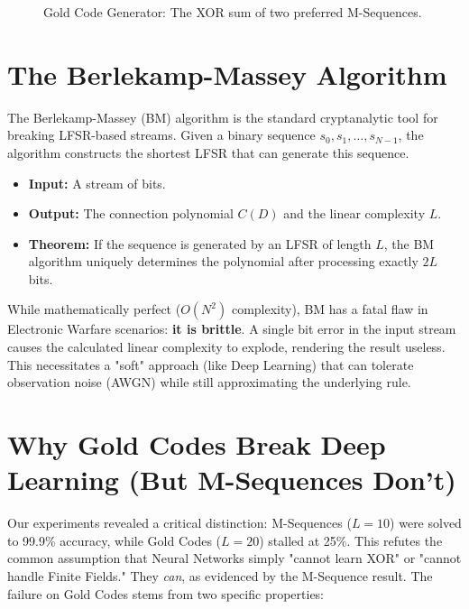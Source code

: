 \documentclass[12pt,a4paper]{report}
\theoremstyle{plain}
\begin{document}
\begin{figure}[H]
    \centering
    \caption{Gold Code Generator: The XOR sum of two preferred M-Sequences.}
    \label{fig:goldcode}
\end{figure}

\section{The Berlekamp-Massey Algorithm}
The Berlekamp-Massey (BM) algorithm is the standard cryptanalytic tool for breaking LFSR-based streams. Given a binary sequence $s_0, s_1, \dots, s_{N-1}$, the algorithm constructs the shortest LFSR that can generate this sequence.
\begin{itemize}
    \item \textbf{Input:} A stream of bits.
    \item \textbf{Output:} The connection polynomial $C(D)$ and the linear complexity $L$.
    \item \textbf{Theorem:} If the sequence is generated by an LFSR of length $L$, the BM algorithm uniquely determines the polynomial after processing exactly $2L$ bits.
\end{itemize}
While mathematically perfect ($O(N^2)$ complexity), BM has a fatal flaw in Electronic Warfare scenarios: \textbf{it is brittle}. A single bit error in the input stream causes the calculated linear complexity to explode, rendering the result useless. This necessitates a "soft" approach (like Deep Learning) that can tolerate observation noise (AWGN) while still approximating the underlying rule.

\section{Why Gold Codes Break Deep Learning (But M-Sequences Don't)}
Our experiments revealed a critical distinction: M-Sequences ($L=10$) were solved to 99.9\% accuracy, while Gold Codes ($L=20$) stalled at 25\%. This refutes the common assumption that Neural Networks simply "cannot learn XOR" or "cannot handle Finite Fields." They \textit{can}, as evidenced by the M-Sequence result. The failure on Gold Codes stems from two specific properties:
\end{document}
